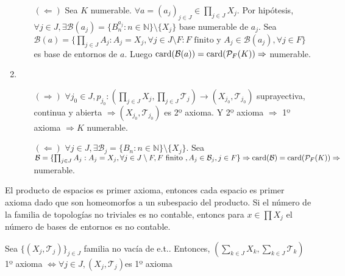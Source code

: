 \begin{dem}
\begin{enumerate}[label=(\roman*)]
\begin{enumerate}[label=(\roman*)]
      \item [$(\Leftarrow)$] Sea $K$ numerable. $\forall a = ( a_{j} )_{j \in J} \in \prod_{j \in J} X_{j}$. Por hipótesis, $\forall j \in J, \exists \mathcal{B} (a_{j}) = \{  B_{n}^{a_{j}} : n \in \mathbb{N} \} \setminus \{  X_{j} \}$ base numerable de $a_{j}$. Sea $\mathcal{B} (a) = \{ \prod_{j \in J} A_{j} : A_{j} = X_{j}, \forall j \in J \setminus F : F \text{ finito y } A_{j} \in \mathcal{B}(a_{j}), \forall j \in F \}$ es base de entornos de $ a$. Luego $\operatorname{card}(\mathcal{B} (a)) = \operatorname{card}( \mathcal{P}_{F}(K)) \Rightarrow$ numerable.
    \end{enumerate}
    \item \begin{enumerate}[label=(\roman*)]
      \item []
      \item [$(\Rightarrow)$] $\forall j_{0} \in J, p_{j_{0}} : ( \prod_{j \in J} X_{j}, \prod_{j \in J} \mathcal{T}_{j} ) \to ( X_{j_{0}}, \mathcal{T}_{j_{0}} )$ suprayectiva, continua y abierta $\Rightarrow ( X_{j_{0}}, \mathcal{T}_{j_{0}} )$ es 2º axioma. Y 2º axioma $\Rightarrow$ 1º axioma $\Rightarrow K$ numerable.
      \item [$(\Leftarrow)$] $\forall j \in J, \exists \mathcal{B}_{j} = \{ B_{n} : n \in \mathbb{N} \} \setminus \{ X_{j} \}$. Sea $\mathcal{B} = \{  \prod_{j \in J} A_{j}: A_{j} = X_{j}, \forall j \in J \setminus F, F \text{ finito }, A_{j} \in \mathcal{B}_{j}, j \in F \} \Rightarrow \operatorname{card}(\mathcal{B}) = \operatorname{card}(\mathcal{P}_{F}(K)) \Rightarrow $ numerable.
    \end{enumerate}
  \end{enumerate}
\end{dem}

\begin{obs}
  El producto de espacios es primer axioma, entonces cada espacio es primer axioma dado que son homeomorfos a un subespacio del producto. Si el número de la familia de topologías no triviales es no contable, entoncs para $x \in \prod X_{j}$ el número de bases de entornos es no contable.
\end{obs}

\begin{prop}
  Sea $\{ ( X_{j}, \mathcal{T}_{j} ) \}_{j \in J}$ familia no vacía de e.t.. Entonces, $( \sum_{k \in J} X_{k}, \sum_{k \in J} \mathcal{T}_{k})$ 1º axioma $\Leftrightarrow \forall j \in J, ( X_{j}, \mathcal{T}_{j} )$es 1º axioma
\end{prop}

